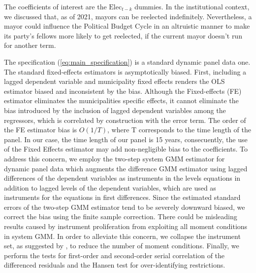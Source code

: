 The coefficients of interest are the $\text{Elec}_{t-k}$ dummies. In the institutional context, we discussed that, as of 2021, mayors can be reelected indefinitely. Nevertheless, a mayor could influence the Political Budget Cycle in an altruistic manner to make its party's fellows more likely to get reelected, if the current mayor doesn't run for another term. 


The specification (\ref{eq:main_specification}) is a standard dynamic panel data one. The standard fixed-effects estimators is asymptotically biased. First, including a lagged dependent variable and municipality fixed effects renders the OLS estimator biased and inconsistent by the \textcite{nickell1981} bias. Although the Fixed-effects (FE) estimator eliminates the municipalities specific effects, it cannot eliminate the bias introduced by the inclusion of lagged dependent variables among the regressors, which is correlated by construction with the error term. The order of the FE estimator bias is $O(1/T)$, where T corresponds to the time length of the panel. In our case, the time length of our panel is 15 years, consecuently, the use of the Fixed Effects estimator may add non-negligible bias to the coefficients. To address this concern, we employ the \textcite{blundell1998} two-step system GMM estimator for dynamic panel data which augments the \textcite{arellano1991} difference GMM estimator using lagged differences of the dependent variables as instruments in the levels equations in addition to lagged levels of the dependent variables, which are used as instruments for the equations in first differences. Since the estimated standard errors of the two-step GMM estimator tend to be severely downward biased, we correct the bias using the \textcite{windmeijer2005} finite sample correction. There could be misleading results caused by instrument proliferation from exploiting all moment conditions in system GMM. In order to alleviate this concern, we collapse the instrument set, as suggested by \textcite{roodman2009}, to reduce the number of moment conditions. Finally, we perform the \textcite{arellano1991} tests for first-order and second-order serial correlation of the differenced residuals and the Hansen test for over-identifying restrictions. 

